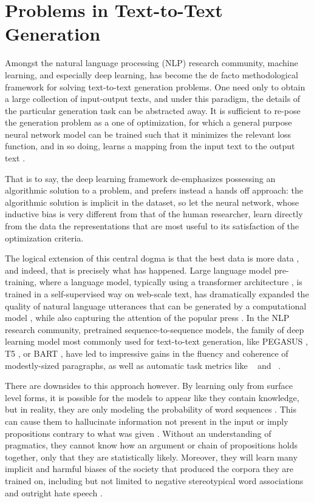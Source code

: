 \section{Problems in Text-to-Text Generation}
  
Amongst the natural language processing (NLP) research community, machine
learning, and especially deep learning, has become the de facto methodological
framework  for solving text-to-text generation problems.  One need only to
obtain a large collection of input-output texts, and under this paradigm, the
details of the particular generation task can be abstracted away. It is
sufficient to re-pose the generation problem as a one of optimization, for
which a general purpose neural network model can be trained such that it
minimizes the relevant loss function, and in so doing, learns a mapping from
the input text to the output text
\citep{sutskever2014,bahdanau2015,rush2015,nallapati2016,see2017}. 

That is to say, the deep learning framework de-emphasizes possessing an
algorithmic solution to a problem, and prefers instead a hands off approach:
the algorithmic solution is implicit in the dataset, so let the neural network,
whose inductive bias is very different from that of the human researcher, learn
directly from the data the representations that are most useful to its
satisfaction of the optimization criteria.

The logical extension of this central dogma is that the best data is more data
\citep{halevy2009}, and indeed, that is precisely what has happened. Large
language model pre-training, where a language model, typically using a
transformer architecture \citep{vaswani2017}, is trained in a self-supervised
way on web-scale text, has dramatically expanded the quality of natural
language utterances that can be generated by a computational model
\citep{radford2019,brown2020}, while also capturing the attention of the
popular press \citep{simonite2019,vincent2019}. In the NLP research community,
pretrained sequence-to-sequence models, the family of deep learning model most
commonly used for text-to-text generation, like PEGASUS \citep{zhang2019}, T5
\citep{raffel2020}, or BART \citep{lewis2020}, have led to impressive gains in
the fluency and coherence of modestly-sized paragraphs, as well as automatic
task metrics like \bleu~\citep{papineni2002} and \rouge~\citep{lin2004}.

There are downsides to this approach however. By learning only from surface
level forms, it is possible for the models to appear like they contain
knowledge, but in reality, they are only modeling the probability of word
sequences \citep{bender2020}. This can cause them to hallucinate information
not present in the input or imply propositions contrary to what was given
\citep{wiseman2017,kryscinski2019,maynez2020,kryscinski2020}.  Without an
understanding of pragmatics, they cannot know how an argument or chain of
propositions holds together, only that they are statistically likely.
Moreover, they will learn many implicit and harmful biases of the society that
produced the corpora they are trained on, including but not limited to negative
stereotypical word associations \citep{bolukbasi2016,nissim2020} and outright
hate speech \citep{lee2016}.

